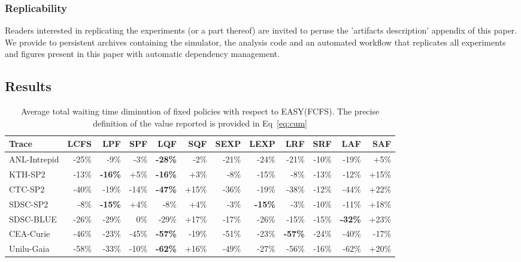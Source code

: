 \documentclass[sigconf,anonymous]{acmart}
\newcommand{\ra}[1]{\renewcommand{\arraystretch}{#1}}
\begin{document}
\subsubsection{Replicability}

Readers interested in replicating the experiments (or a part thereof) are
invited to peruse the 'artifacts description' appendix of this paper. We
provide to persistent archives containing the simulator, the analysis code and
an automated workflow that replicates all experiments and figures present in
this paper with automatic dependency management.

\subsection{Results}
\label{sub:results}

\begin{table}[]
  \centering
  \ra{1.3}

  \caption{Average total waiting time diminution of fixed policies with respect
  to EASY(FCFS). The precise definition of the value reported is provided in
Eq~\eqref{eq:cum}}


  \label{tab:full}
  \begin{tabular}{@{}lrrrrrrrrrrr@{}}
    \hline
    Trace        & LCFS  & LPF            & SPF   & LQF            & SQF   & SEXP  & LEXP           & LRF            & SRF   & LAF          & SAF   \\
    \hline
    ANL-Intrepid & -25\% & -9\%           & -3\%  & \textbf{-28\%} & -2\%  & -21\% & -24\%          & -21\%          & -10\% & -19\%        & +5\%  \\
    KTH-SP2      & -13\% & \textbf{-16\%} & +5\%  & \textbf{-16\%} & +3\%  & -8\%  & -15\%          & -8\%           & -13\% & -12\%        & +15\% \\
    CTC-SP2      & -40\% & -19\%          & -14\% & \textbf{-47\%} & +15\% & -36\% & -19\%          & -38\%          & -12\% & -44\%        & +22\% \\
    SDSC-SP2     & -8\%  & \textbf{-15\%} & +4\%  & -8\%           & +4\%  & -3\%  & \textbf{-15\%} & -3\%           & -10\% & -11\%        & +18\% \\
    SDSC-BLUE    & -26\% & -29\%          & 0\%   & -29\%          & +17\% & -17\% & -26\%          & -15\%          & -15\% & \textbf{-32\%} & +23\% \\
    CEA-Curie    & -46\% & -23\%          & -45\% & \textbf{-57\%} & -19\% & -51\% & -23\%          & \textbf{-57\%} & -24\% & -40\%        & -17\% \\
    Unilu-Gaia   & -58\% & -33\%          & -10\% & \textbf{-62\%} & +16\% & -49\% & -27\%          & -56\%          & -16\% & -62\%        & +20\% \\
    \hline
  \end{tabular}
\end{table}
\end{document}
